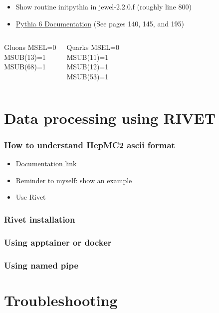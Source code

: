 \documentclass{beamer}
\begin{document}
\begin{frame}
 \begin{itemize}
  \item Show routine initpythia in jewel-2.2.0.f (roughly line 800)
  \item \href{https://pythia.org/download/pythia6/lutp0613man2.pdf}{Pythia 6 Documentation} (See pages 140, 145, and 195)
 \end{itemize}

 \begin{columns}

  \begin{exampleblock}{Gluons}
MSEL=0 \\
MSUB(13)=1\\
MSUB(68)=1\\
\phantom{Place holder}
  \end{exampleblock}

  \begin{block}{Quarks}
MSEL=0\\
MSUB(11)=1\\
MSUB(12)=1\\
MSUB(53)=1
  \end{block}


 \end{columns}


\end{frame}


\section{Data processing using RIVET}

\begin{frame}
 \frametitle{How to understand HepMC2 ascii format}
 \begin{itemize}
  \item \href{http://hepmc.web.cern.ch/hepmc/releases/HepMC2_user_manual.pdf}{Documentation link}
  \item Reminder to myself: show an example
  \item Use Rivet
 \end{itemize}

\end{frame}


\begin{frame}
 \frametitle{Rivet installation}
\end{frame}

\begin{frame}
 \frametitle{Using apptainer or docker}
\end{frame}


\begin{frame}
 \frametitle{Using named pipe}
\end{frame}


\section{Troubleshooting}
\end{document}
